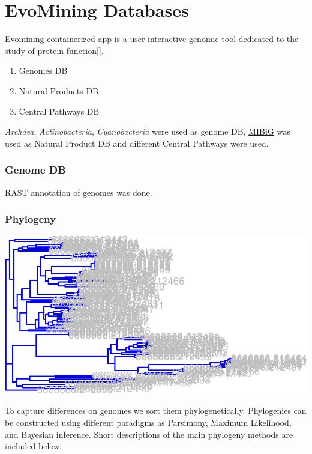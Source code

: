 \documentclass[12pt,twoside]{reedthesis}
\providecommand{\tightlist}{%
  \setlength{\itemsep}{0pt}\setlength{\parskip}{0pt}}
\begin{document}
  \section{EvoMining Databases}\label{evomining-databases}
  
  Evomining containerized app is a user-interactive genomic tool dedicated
  to the study of protein function{[}{]}.
  
  \begin{enumerate}
  \def\labelenumi{\arabic{enumi}.}
  \tightlist
  \item
    Genomes DB
  \item
    Natural Products DB
  \item
    Central Pathways DB
  \end{enumerate}
  
  \emph{Archaea}, \emph{Actinobacteria}, \emph{Cyanobacteria} were used as
  genome DB, \href{http://mibig.secondarymetabolites.org/}{MIBiG} was used
  as Natural Product DB and different Central Pathways were used.
  
  \subsubsection{Genome DB}\label{genome-db}
  
  RAST annotation of genomes was done.
  
  \subsubsection{Phylogeny}\label{phylogeny}
  
  \begin{center}\includegraphics{tesis_files/figure-latex/testingPhylogeny-1} \end{center}
  
  To capture differences on genomes we sort them phylogenetically.
  Phylogenies can be constructed using different paradigms as Parsimony,
  Maximum Likelihood, and Bayesian inference. Short descriptions of the
  main phylogeny methods are included below.
  
\end{document}
